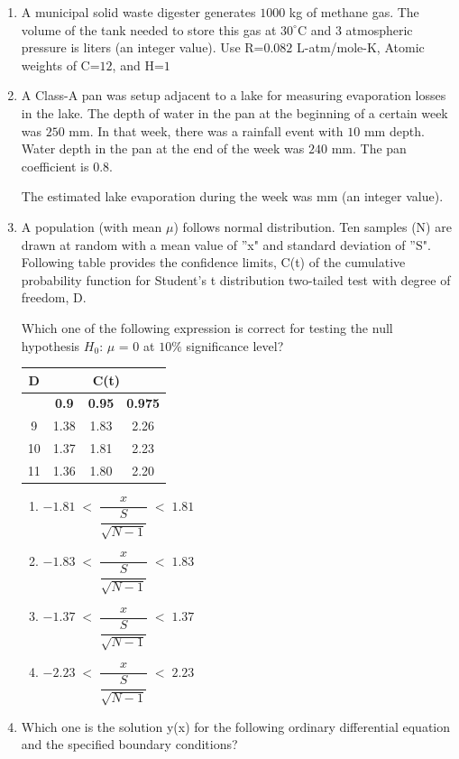 \documentclass[journal]{IEEEtran}
\numberwithin{equation}{enumi}
\numberwithin{figure}{enumi}
\begin{document}
\begin{enumerate}[start=1, label={Q\arabic*.}]
\vspace{0.1cm}
\item A municipal solid waste digester generates $1000$ kg of methane gas. The volume of
the tank needed to store this gas at $30^{\circ}$C and $3$ atmospheric pressure is \underline{\hspace{1.5cm}} liters
(an integer value).
Use R=$0.082$ L-atm/mole-K, Atomic weights of C=$12$, and H=$1$
\vspace{0.1cm}
\item A Class-A pan was setup adjacent to a lake for measuring evaporation losses in the lake.
The depth of water in the pan at the beginning of a certain week was $250$ mm. In that week,
there was a rainfall event with $10$ mm depth. Water depth in the pan at the end of the week
was $240$ mm. The pan coefficient is $0.8$.

\vspace{0.1cm}
The estimated lake evaporation during the week was \underline{\hspace{1.5cm}} mm (an integer value).
\vspace{0.1cm}
\item A population (with mean $\mu$) follows normal distribution. Ten samples (N) are drawn
at random with a mean value of ''x" and standard deviation of ''S". Following table
provides the confidence limits, C(t) of the cumulative probability function for
Student's t distribution two-tailed test with degree of freedom, D.

\vspace{0.1cm}
Which one of the following expression is correct for testing the null hypothesis
$H_0$: $\mu$ = $0$ at $10\%$ significance level?
\begin{table}[H]
\centering
\begin{tabular}{|c|c|c|c|}
\hline
\textbf{D} & \multicolumn{3}{c|}{\textbf{C(t)}} \\ \hline
 & \textbf{0.9} & \textbf{0.95} & \textbf{0.975} \\ \hline
9  & 1.38 & 1.83 & 2.26 \\ \hline
10 & 1.37 & 1.81 & 2.23 \\ \hline
11 & 1.36 & 1.80 & 2.20 \\ \hline
\end{tabular}
\end{table}
\begin{enumerate}[label=(\Alph*)]
    \item $-1.81 \;<\; \dfrac{x}{\dfrac{S}{\sqrt{N-1}}} \;<\; 1.81$
    \item $-1.83 \;<\; \dfrac{x}{\dfrac{S}{\sqrt{N-1}}} \;<\; 1.83$
    \item $-1.37 \;<\; \dfrac{x}{\dfrac{S}{\sqrt{N-1}}} \;<\; 1.37$
    \item $-2.23 \;<\; \dfrac{x}{\dfrac{S}{\sqrt{N-1}}} \;<\; 2.23$
\end{enumerate}
\newpage
\item Which one is the solution y(x) for the following ordinary differential equation and the
specified boundary conditions?
  

\end{enumerate}
\end{document}
